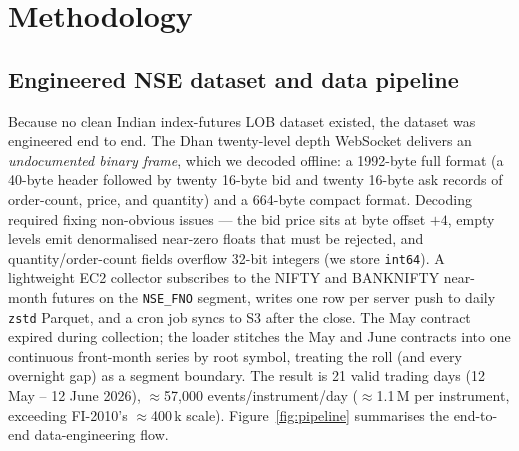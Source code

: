 \documentclass[fonts]{icst}
\begin{document}
\section{Methodology}
\subsection{Engineered NSE dataset and data pipeline}
Because no clean Indian index-futures LOB dataset existed, the dataset was engineered end to end. The Dhan
twenty-level depth WebSocket delivers an \emph{undocumented binary frame}, which we decoded offline: a
1992-byte full format (a 40-byte header followed by twenty 16-byte bid and twenty 16-byte ask records of
order-count, price, and quantity) and a 664-byte compact format. Decoding required fixing non-obvious issues
--- the bid price sits at byte offset $+4$, empty levels emit denormalised near-zero floats that must be
rejected, and quantity/order-count fields overflow 32-bit integers (we store \texttt{int64}). A lightweight
EC2 collector subscribes to the NIFTY and BANKNIFTY near-month futures on the \texttt{NSE\_FNO} segment,
writes one row per server push to daily \texttt{zstd} Parquet, and a cron job syncs to S3 after the close. The
May contract expired during collection; the loader stitches the May and June contracts into one continuous
front-month series by root symbol, treating the roll (and every overnight gap) as a segment boundary. The
result is 21 valid trading days (12 May -- 12 June 2026), $\approx$57{,}000 events/instrument/day
($\approx$1.1\,M per instrument, exceeding FI-2010's $\approx$400\,k scale). Figure~\ref{fig:pipeline}
summarises the end-to-end data-engineering flow.
\end{document}

